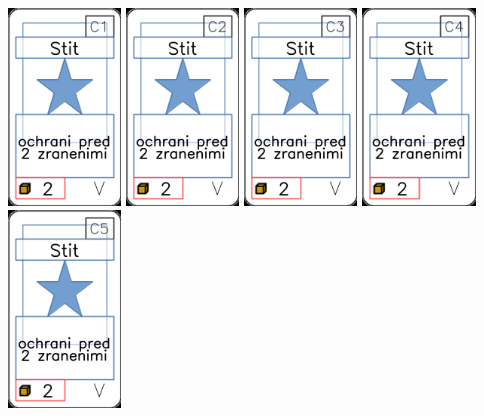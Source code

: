 \documentclass[a4paper]{article}
\begin{document}
	\includegraphics[width=3.0cm]{img-1_70}
	\includegraphics[width=3.0cm]{img-1_71}
	\includegraphics[width=3.0cm]{img-1_72}
	\includegraphics[width=3.0cm]{img-1_73}
	\includegraphics[width=3.0cm]{img-1_74}
\end{document}
